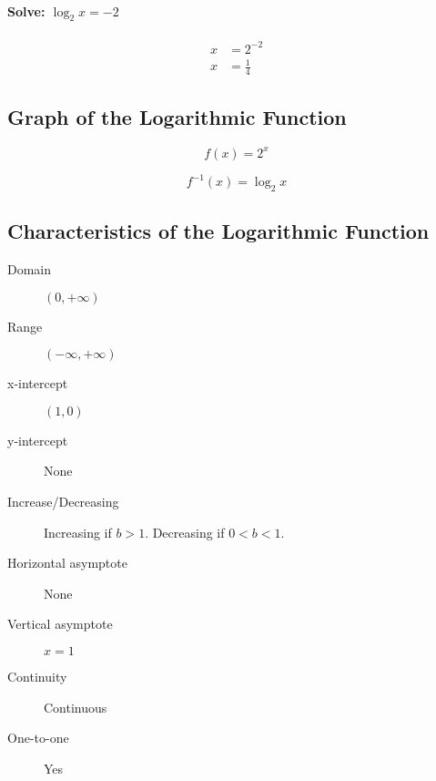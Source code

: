 			\paragraph{Solve: $\log_2 x = -2$}
				\begin{align*}
					x &= 2^{-2}\\
					x &= \frac{1}{4}
				\end{align*}
		\subsection{Graph of the Logarithmic Function}
			\begin{minipage}{0.5\textwidth}
				\centering
				\[f(x)=2^x\]
			\end{minipage}
			\begin{minipage}{0.5\textwidth}
				\centering
				\[f^{-1}(x)=\log_2 x\]
			\end{minipage}
		\subsection{Characteristics of the Logarithmic Function}
			\begin{description}
				\item[Domain] $(0, +\infty)$
				\item[Range] $(-\infty, +\infty)$
				\item[x-intercept] $(1, 0)$
				\item[y-intercept] None
				\item[Increase/Decreasing] Increasing if $b > 1$. Decreasing if $0 < b < 1$.
				\item[Horizontal asymptote] None
				\item[Vertical asymptote] $x=1$
				\item[Continuity] Continuous
				\item[One-to-one] Yes
			\end{description}
